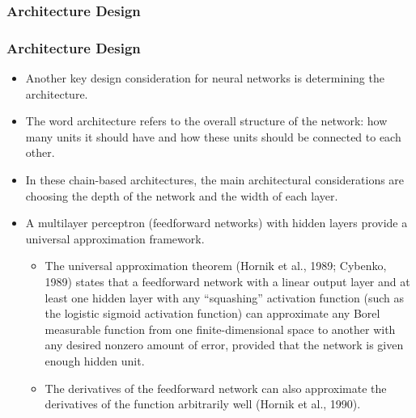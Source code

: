 \documentclass[
  shownotes,
  xcolor={svgnames},
  hyperref={colorlinks,citecolor=DarkBlue,linkcolor=DarkRed,urlcolor=DarkBlue}
  , aspectratio=169]{beamer}
\begin{document}
\subsubsection{Architecture Design}
\begin{frame}
\frametitle{Architecture Design}

\begin{itemize}


\item Another key design consideration for neural networks is determining the architecture.

\item The word architecture refers to the overall structure of the network: how many units it should have and how these units should be connected to each other.

\item In these chain-based architectures, the main architectural considerations are choosing the depth of the network and the width of each layer. 

\item A multilayer perceptron (feedforward networks) with hidden layers provide a universal approximation framework. 
\begin{itemize}
\item The universal approximation theorem (Hornik et al., 1989; Cybenko, 1989) states that a feedforward network with a linear output layer and at least one hidden layer with any “squashing” activation function (such as the logistic sigmoid activation function) can approximate any Borel measurable function from one ﬁnite-dimensional space to another with any desired nonzero amount of error, provided that the network is given enough hidden unit.

\item The derivatives of the feedforward network can also approximate the derivatives of the
function arbitrarily well (Hornik et al., 1990). 
\end{itemize}



\end{itemize}

\end{frame}
\end{document}
